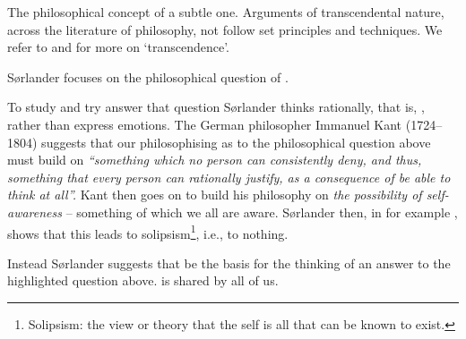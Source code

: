 \label{5.Bibliographical Note}

\begynd
\pind The philosophical concept of  \nyl
       a subtle one.
\pind Arguments of transcendental nature, \nyl across the literature of
      philosophy, \nyl {} not follow set principles and techniques.
\pind We refer to
\begynd
\pind  \cite[,
      pages 807--810]{cambridge.dict.phil95}  and
\pind  \cite[, Chapter 22: Kant (David
      Bell), pages 589--606, Bunnin and Tsui-James,
      eds.]{blackwell96} 
\afslut  for more on `transcendence'. 
\afslut 
{}%

\label{The Philosophical Question}

\pos{}{\vspace*{-10mm}}

\begynd
\pind S{\o}rlander focuses on the philosophical question of .
    
\pind To study and try answer that question S{\o}rlander thinks
      rationally, that is,
      , rather than
      express
      emotions. 
\pind The German philosopher \textsf{Immanuel Kant (1724--1804)}
      suggests that our philosophising as to the  philosophical
      question above must build on \textsl{``something which no person can
      consistently  deny, and thus, something that every person can
      rationally justify, as a consequence of be able to think at all''.}
\pind Kant then goes on to build his philosophy \cite{Kant:Dines} on
      \textsl{the possibility of self-awareness}
      -- something of which we all are aware.
\pind S{\o}rlander then, in for example \cite{kaisorlander2016}, shows
      that this leads to solipsism\footnote{\LLLL Solipsism: the
      view or theory that the self is all that can be known to
      exist.}, i.e., to nothing.
\afslut
   
 
\label{The Possibility of Truth}

\begynd
\pind Instead S{\o}rlander suggests that   be the basis for the thinking of an answer to the
      highlighted question above.
\pind {} is shared by all of us.
\afslut

